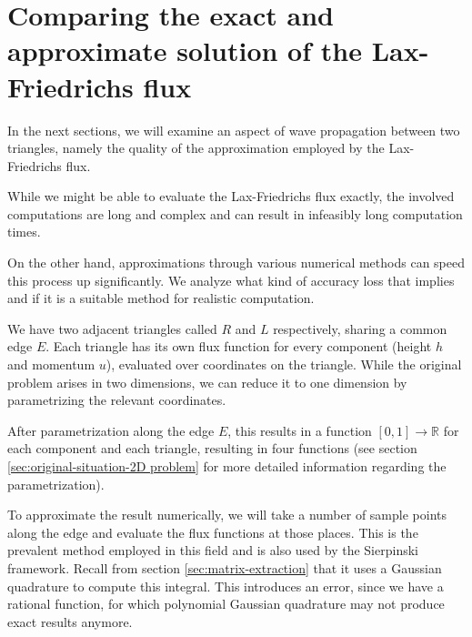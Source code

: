 \documentclass[a4paper, twoside]{article}
\newcommand{\reals}{\mathbb{R}}
\begin{document}


\newpage
\part{Comparing the exact and approximate solution of the Lax-Fried\-richs flux}
\label{part:polynomial-comparison}

In the next sections, we will examine an aspect of wave propagation between two triangles, namely the quality of the approximation employed by the Lax-Friedrichs flux.

While we might be able to evaluate the Lax-Friedrichs flux exactly, the involved computations are long and complex and can result in infeasibly long computation times.

On the other hand, approximations through various numerical methods can speed this process up significantly. We analyze what kind of accuracy loss that implies and if it is a suitable method for realistic computation.

We have two adjacent triangles called $R$ and $L$ respectively, sharing a common edge $E$. Each triangle has its own flux function for every component (height $h$ and momentum $u$), evaluated over coordinates on the triangle. While the original problem arises in two dimensions, we can reduce it to one dimension by parametrizing the relevant coordinates.

After parametrization along the edge $E$, this results in a function $[0,1]\rightarrow\reals$ for each component and each triangle, resulting in four functions (see section \ref{sec:original-situation-2D problem} for more detailed information regarding the parametrization).

To approximate the result numerically, we will take a number of sample points along the edge and evaluate the flux functions at those places. This is the prevalent method employed in this field \cite{castro07high-order-ader-fv-dg-numerical-methods,schwaiger08adaptive} and is also used by the Sierpinski framework. Recall from section \ref{sec:matrix-extraction} that it uses a Gaussian quadrature to compute this integral. This introduces an error, since we have a rational function, for which polynomial Gaussian quadrature may not produce exact results anymore.
\end{document}
